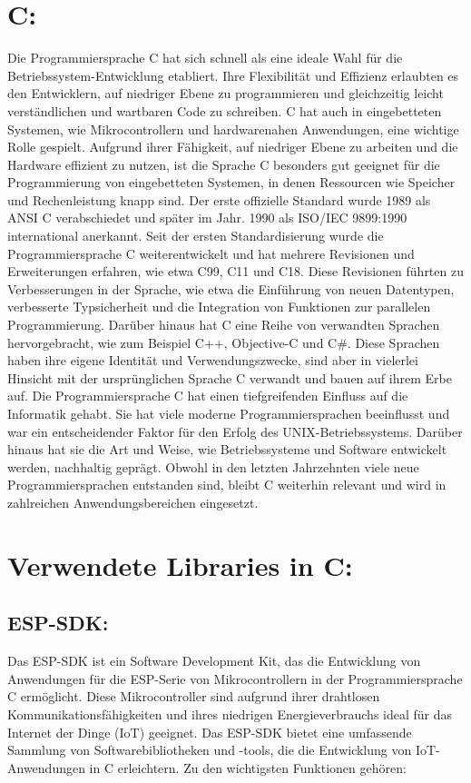 \section{C:}
Die Programmiersprache C hat sich schnell als eine ideale Wahl für die Betriebssystem-Entwicklung etabliert. Ihre Flexibilität und Effizienz erlaubten es den Entwicklern, auf niedriger Ebene zu programmieren und gleichzeitig leicht verständlichen und wartbaren Code zu schreiben. 
C hat auch in eingebetteten Systemen, wie Mikrocontrollern und hardwarenahen Anwendungen, eine wichtige Rolle gespielt. 
Aufgrund ihrer Fähigkeit, auf niedriger Ebene zu arbeiten und die Hardware effizient zu nutzen, ist die Sprache C besonders gut geeignet für die Programmierung von eingebetteten Systemen, in denen Ressourcen wie Speicher und Rechenleistung knapp sind. 
Der erste offizielle Standard wurde 1989 als ANSI C verabschiedet und später im Jahr. 1990 als ISO/IEC 9899:1990 international anerkannt.
Seit der ersten Standardisierung wurde die Programmiersprache C weiterentwickelt und hat mehrere Revisionen und Erweiterungen erfahren, wie etwa C99, C11 und C18. 
Diese Revisionen führten zu Verbesserungen in der Sprache, wie etwa die Einführung von neuen Datentypen, verbesserte Typsicherheit und die Integration von Funktionen zur parallelen Programmierung.
Darüber hinaus hat C eine Reihe von verwandten Sprachen hervorgebracht, wie zum Beispiel C++, Objective-C und C\#. 
Diese Sprachen haben ihre eigene Identität und Verwendungszwecke, sind aber in vielerlei Hinsicht mit der ursprünglichen Sprache C verwandt und bauen auf ihrem Erbe auf.
Die Programmiersprache C hat einen tiefgreifenden Einfluss auf die Informatik gehabt. Sie hat viele moderne Programmiersprachen beeinflusst und war ein entscheidender Faktor für den Erfolg des UNIX-Betriebssystems. 
Darüber hinaus hat sie die Art und Weise, wie Betriebssysteme und Software entwickelt werden, nachhaltig geprägt. 
Obwohl in den letzten Jahrzehnten viele neue Programmiersprachen entstanden sind, bleibt C weiterhin relevant und wird in zahlreichen Anwendungsbereichen eingesetzt. 
\cite{C}
\cite{Wikipedia}





\section{Verwendete Libraries in C:}
\subsection{ESP-SDK:}
Das ESP-SDK ist ein Software Development Kit, das die Entwicklung von Anwendungen für die ESP-Serie von Mikrocontrollern in der Programmiersprache C ermöglicht.
Diese Mikrocontroller sind aufgrund ihrer drahtlosen Kommunikationsfähigkeiten und ihres niedrigen Energieverbrauchs ideal für das Internet der Dinge (IoT) geeignet. 
Das ESP-SDK bietet eine umfassende Sammlung von Softwarebibliotheken und -tools, die die Entwicklung von IoT-Anwendungen in C erleichtern. 
Zu den wichtigsten Funktionen gehören:


